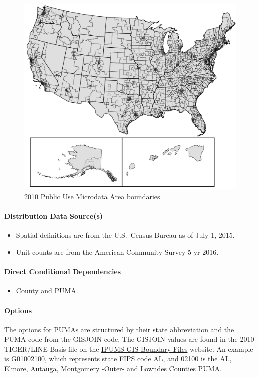 \begin{figure}
    \centering
    \includegraphics[width=1\linewidth]{images/2010-PUMAs.png}
    \caption{2010 Public Use Microdata Area boundaries}
    \label{fig:2010_puma_boundaries}
\end{figure}

\paragraph{Distribution Data Source(s)}
\begin{itemize} 
\item
  Spatial definitions are from the U.S.~Census Bureau as of July 1,
  2015.
\item
  Unit counts are from the American Community Survey 5-yr 2016.
\end{itemize}
\paragraph{Direct Conditional Dependencies}
\begin{itemize}
    \item County and PUMA.
\end{itemize}
\paragraph{Options}
The options for PUMAs are structured by their state abbreviation and the PUMA code from the GISJOIN code. The GISJOIN values are found in the 2010 TIGER/LINE Basis file on the \href{https://usa.ipums.org/usa/volii/boundaries.shtml}{IPUMS GIS Boundary Files}  website. An example is G01002100, which represents state FIPS code AL, and 02100 is the AL, Elmore, Autauga, Montgomery -Outer- and Lowndes Counties PUMA.

